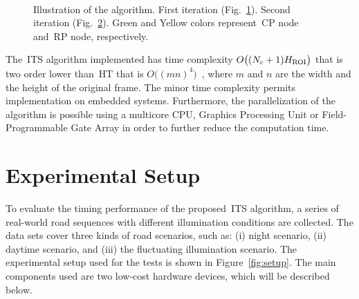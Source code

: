 \begin{figure}[ht]
	\begin{subfigure}[b]{\textwidth}
		\centering
		
		\caption{}
		\label{fig:u1}
	\end{subfigure}
	\\[3ex]
	\begin{subfigure}[b]{\textwidth}
		\centering
		
		\caption{}
		\label{fig:u2}
	\end{subfigure}
	\caption{Illustration of the algorithm. First iteration (Fig.~\ref{fig:u1}). Second iteration (Fig.~\ref{fig:u2}). Green and Yellow colors represent~\gls{CP} node and~\gls{RP}  node, respectively.}
	\label{fig:ITS_double}
\end{figure}


The~\gls{ITS} algorithm implemented has time complexity $O\big((N_c+1) H_{\rm ROI}\big)$ that is two order lower than~\gls{HT} that is $O\big((m n)^4\big)$~\cite{albanesi1991time}, where $m$ and $n$ are the width and the height of the original frame. The minor time complexity permits implementation on embedded systems. Furthermore, the parallelization of the algorithm is possible using a multicore CPU, Graphics Processing Unit or Field-Programmable Gate Array in order to further reduce the computation time. 

\section{Experimental Setup}
\label{sec:Experimental results}

To evaluate the timing performance of the proposed~\gls{ITS} algorithm, a series of real-world road sequences with different illumination conditions are collected. The data sets cover three kinds of road scenarios, such as: (i) night scenario, (ii) daytime scenario, and (iii) the fluctuating illumination scenario. The experimental setup used for the tests is shown in Figure~\ref{fig:setup}. The main components used are two low-cost hardware devices, which will be described below.

